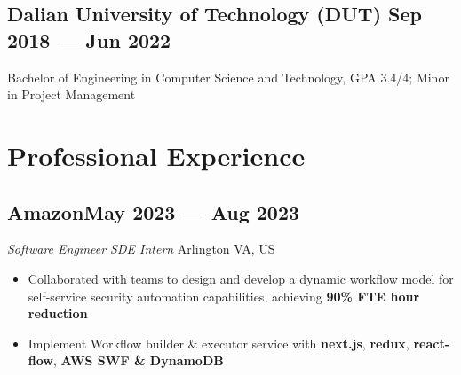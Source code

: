 \documentclass[a4,12pt]{article}
\newcommand{\subtext}[1]{
#1\par\vspace{-0.3cm}}
\newenvironment{zitemize}{
\begin{itemize}\itemsep0pt \parskip0pt \parsep1pt}
{\end{itemize}\vspace{-0.5cm}}
\begin{document}
\vspace{-0.4cm}
\subsection*{Dalian University of Technology (DUT) \hfill \textbf{Sep 2018 --- Jun 2022}}
Bachelor of Engineering in Computer Science and Technology, GPA 3.4/4; Minor in Project Management




\vspace{-0.5cm}


\section{\textbf{Professional Experience}}
        
\vspace{-0.15cm}


\subsection*{\normalsize\textbf{Amazon}\hfill May 2023 --- Aug 2023 } 
\subtext{\textit{Software Engineer SDE Intern} \hfill Arlington VA, US} 
    \begin{zitemize}
        \item Collaborated with teams to design and develop a dynamic workflow model for self-service security automation capabilities, achieving \textbf{90\% FTE hour reduction}
        \item Implement Workflow builder \& executor service with \textbf{next.js}, \textbf{redux}, \textbf{react-flow}, \textbf{AWS SWF \& DynamoDB}
    \end{zitemize}

\vspace{-0.1cm}

\end{document}
